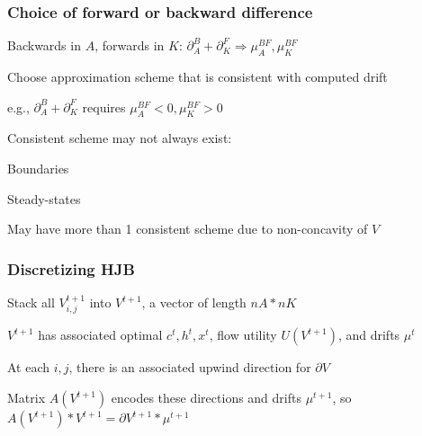 \documentclass[aspectratio=169]{beamer}
\newenvironment{wideitemize}{\itemize\addtolength{\itemsep}{10pt}}{\enditemize}
\begin{document}
\begin{frame}
    \frametitle{Choice of forward or backward difference}

    \begin{wideitemize}
        \item Backwards in $A$, forwards in $K$: $\partial_A^B + \partial_K^F \Rightarrow \mu_A^{BF}, \mu_K^{BF}$
        \item Choose approximation scheme that is consistent with computed drift
        \item e.g., $\partial_A^B + \partial_K^F$ requires $\mu_A^{BF} < 0, \mu_K^{BF} > 0$
        \item Consistent scheme may not always exist:
        \begin{wideitemize}
            \item Boundaries
            \item Steady-states
        \end{wideitemize}
        \item May have more than 1 consistent scheme due to non-concavity of $V$
    \end{wideitemize}

\end{frame}

\begin{frame}
    \frametitle{Discretizing HJB}
    \begin{wideitemize}
        \item Stack all $V_{i, j}^{t+1}$ into $V^{t+1}$, a vector of length $nA * nK$
        \item $V^{t+1}$ has associated optimal $c^t, h^t, x^t$, flow utility $U(V^{t+1})$, and drifts $\mu^t$
        \item At each $i, j$, there is an associated upwind direction for $\partial V$
        \item Matrix $A(V^{t+1})$ encodes these directions and drifts $\mu^{t+1}$, so $A(V^{t+1})*V^{t+1} = \partial V^{t+1}*\mu^{t+1}$
    \end{wideitemize}
    
\end{frame}
\end{document}
